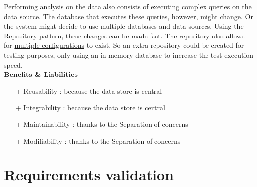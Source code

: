 Performing analysis on the data also consists of executing complex queries on the data source. The database that executes these queries, however, might change. Or the system might decide to use multiple databases and data sources.
Using the Repository pattern, these changes can \underline{be made fast}. The repository also allows for \underline{multiple configurations} to exist. So an extra repository could be created for testing purposes, only using an in-memory database to increase the test execution speed. \\
\textbf{Benefits \& Liabilities} ~
\begin{itemize}
\item[+] Reusability : because the data store is central
\item[+] Integrability : because the data store is central
\item[+] Maintainability : thanks to the Separation of concerns
\item[+] Modifiability : thanks to the Separation of concerns
\end{itemize}

\section{Requirements validation}
\label{sec:req-validation}



